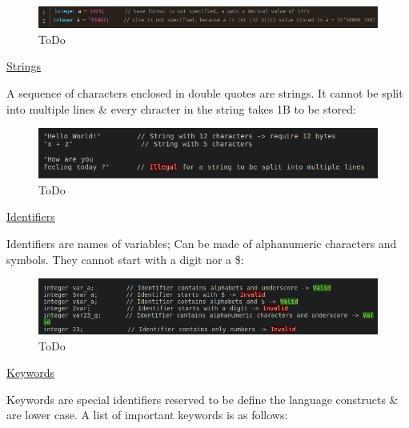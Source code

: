 \documentclass{article}
\begin{document}
	\begin{figure}[H]
		\includegraphics[width=\linewidth]{VerilogPics/figure_7.png}
		\caption{ToDo}
		\label{ToDo}
	\end{figure}
	\underline{Strings} \newline

	A sequence of characters enclosed in double quotes are strings. It cannot be split into multiple lines \& every chracter in the string takes 1B to be stored:

	\begin{figure}[H]
		\includegraphics[width=\linewidth]{VerilogPics/figure_8.png}
		\caption{ToDo}
		\label{ToDo}
	\end{figure}
	
	\underline{Identifiers} \newline

	Identifiers are names of variables; Can be made of alphanumeric characters and symbols. They cannot start with a digit nor a \$:

	\begin{figure}[H]
		\includegraphics[width=\linewidth]{VerilogPics/figure_9.png}
		\caption{ToDo}
		\label{ToDo}
	\end{figure}

	\underline{Keywords}

	Keywords are special identifiers reserved to be define the language constructs \& are lower case. A list of important keywords is as follows:
\end{document}
